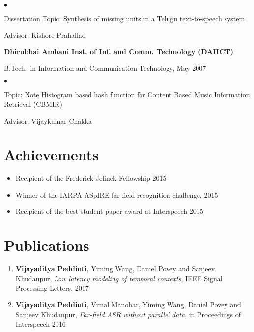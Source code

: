 \documentclass[margin,line,pifont,palatino,courier]{res}
\newenvironment{list1}{
  \begin{list}{\ding{113}}{%
      \setlength{\itemsep}{0in}
      \setlength{\parsep}{0in} \setlength{\parskip}{0in}
      \setlength{\topsep}{0in} \setlength{\partopsep}{0in}
      \setlength{\leftmargin}{0.17in}}}{\end{list}}
\newenvironment{list2}{
  \begin{list}{$\bullet$}{%
      \setlength{\itemsep}{0in}
      \setlength{\parsep}{0in} \setlength{\parskip}{0in}
      \setlength{\topsep}{0in} \setlength{\partopsep}{0in}
      \setlength{\leftmargin}{0.2in}}}{\end{list}}
\begin{document}
\begin{resume}
\begin{list1}
\begin{list2}
\vspace*{.05in}
\item Dissertation Topic:  Synthesis of missing units in a Telugu text-to-speech system
\item Advisor: Kishore Prahallad
\end{list2}
\end{list1}

{\bf Dhirubhai Ambani Inst. of Inf. and Comm. Technology (DAIICT)}\\
\vspace*{-.1in}
\begin{list1}
\item[] B.Tech.~in Information and Communication Technology, May 2007

\begin{list2}
\vspace*{.05in}
\item Topic: Note Histogram based hash function for Content Based Music Information Retrieval (CBMIR)
\item Advisor: Vijaykumar Chakka
\end{list2}
\end{list1}

\section{\sc Achievements}
\begin{itemize}
\item Recipient of the Frederick Jelinek Fellowship 2015
\item Winner of the IARPA ASpIRE far field recognition challenge, 2015
\item Recipient of the best student paper award at Interspeech 2015
\end{itemize}


\section{\sc Publications}
\begin{enumerate}

\item \textbf{Vijayaditya Peddinti}, Yiming Wang, Daniel Povey and Sanjeev Khudanpur,
\textit{Low latency modeling of temporal contexts}, IEEE Signal Processing Letters, 2017\\

\item \textbf{Vijayaditya Peddinti}, Vimal Manohar, Yiming Wang, Daniel Povey and Sanjeev Khudanpur,
\textit{Far-field ASR without parallel data}, in Proceedings of Interspeech 2016\\


\end{enumerate}
\end{resume}
\end{document}
